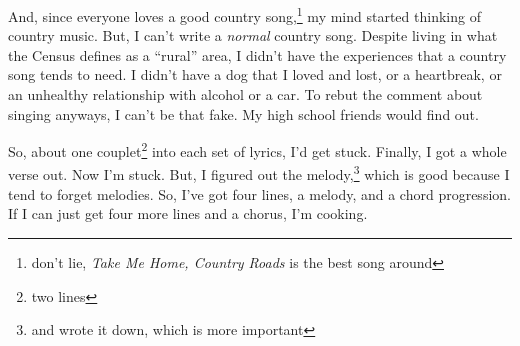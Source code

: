 \documentclass[12pt]{article}[titlepage]
\newcommand{\say}[1]{``#1''}
\newcommand{\1}{\={a}}
\newcommand{\2}{\={e}}
\newcommand{\3}{\={\i}}
\newcommand{\4}{\=o}
\newcommand{\5}{\=u}
\newcommand{\6}{\={A}}
\renewcommand{\,}{\textsuperscript{,}}
\begin{document}
And, since everyone loves a good country song,\footnote{don't lie, \textit{Take Me Home, Country Roads} is the best song around} my mind started thinking of country music.
But, I can't write a \textit{normal} country song.
Despite living in what the Census defines as a \say{rural} area, I didn't have the experiences that a country song tends to need.
I didn't have a dog that I loved and lost, or a heartbreak, or an unhealthy relationship with alcohol or a car.
To rebut the comment about singing anyways, I can't be that fake.
My high school friends would find out.

So, about one couplet\footnote{two lines} into each set of lyrics, I'd get stuck.
Finally, I got a whole verse out.
Now I'm stuck.
But, I figured out the melody,\footnote{and wrote it down, which is more important} which is good because I tend to forget melodies.
So, I've got four lines, a melody, and a chord progression.
If I can just get four more lines and a chorus, I'm cooking.
\end{document}
